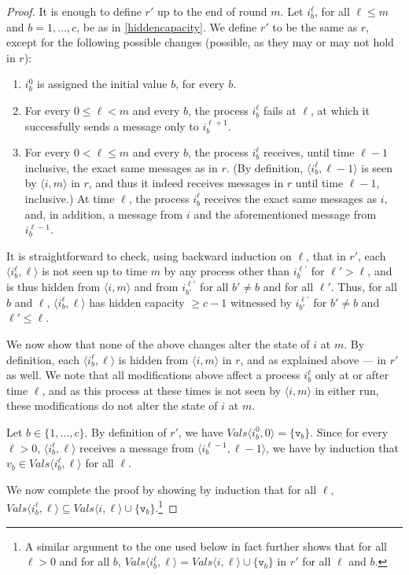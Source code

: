 \documentclass[11pt]{article}
\theoremstyle{definition}
\newcommand{\knownvals}[1]{\ensuremath{\mathit{Vals}\node{#1}}}
\newcommand{\set}[1]{\{#1\}}
\newcommand{\node}[1]{\langle#1\rangle}
\begin{document}
\begin{proof}
It is enough to define $r'$ up to the end of round $m$.
Let $i_b^{\ell}$,
for all $\ell\le m$ and $b=1,\ldots,c$,
be as in \cref{hiddencapacity}.
We define $r'$ to be the same as $r$, except for the following possible changes
(possible, as they may or may not hold in $r$):
\begin{enumerate}
\item
$i_b^0$ is assigned the initial value $b$, for every $b$.
\item
For every $0\le \ell < m$ and every $b$, the process
$i_b^{\ell}$ fails at $\ell$, at which
it successfully sends a message only to $i_b^{\ell+1}$.
\item
For every $0 < \ell \le m$ and every $b$, the process
$i_b^{\ell}$
receives, until time $\ell-1$ inclusive, the
exact same messages as in $r$. (By definition, $\node{i_b^\ell,\ell-1}$ is seen
by $\node{i,m}$ in $r$, and thus it indeed receives messages in $r$ until time
$\ell-1$, inclusive.) At time $\ell$, the process
$i_b^{\ell}$ receives the exact same messages as $i$, and, in addition,
a message from $i$ and the aforementioned message from~$i_b^{\ell-1}$.
\end{enumerate}

It is straightforward to check, using backward induction on $\ell$, that in $r'$,
each $\node{i_b^{\ell},\ell}$ is not seen up to time $m$ by any process
other than
$i_b^{\ell'}$ for $\ell'>\ell$,
and is thus hidden from $\node{i,m}$ and from $i_{b'}^{\ell'}$ for all
$b' \ne b$ and for all $\ell'$.
Thus, for all $b$ and $\ell$, $\node{i_b^{\ell},\ell}$
has hidden capacity $\ge c-1$ witnessed by
$i_{b'}^{\ell'}$ for $b'\ne b$ and $\ell'\le \ell$.

We now show that none of the above changes alter the state of $i$ at $m$.
By definition, each $\node{i_b^{\ell},\ell}$ is hidden from $\node{i,m}$
in $r$, and as explained above --- in $r'$ as well.
We note that all modifications above affect a process $i_b^{\ell}$ only at
or after time $\ell$, and as this process at these times is not seen by
$\node{i,m}$
in either run, these modifications do not alter the state of $i$
at $m$.

Let $b \in \set{1,\ldots,c}$.
By definition of $r'$, we have $\knownvals{i_b^0,0} = \set{\mathtt{v}_b}$.
Since for every $\ell>0$, $\node{i_b^{\ell},\ell}$ receives a message from
$\node{i_b^{\ell-1},\ell-1}$, we have by induction that
$v_b \in \knownvals{i_b^{\ell},\ell}$ for all $\ell$.

We now complete the proof by showing by induction that for all $\ell$,
$\knownvals{i_b^{\ell},\ell} \subseteq \knownvals{i,\ell} \cup \set{\mathtt{v}_b}$.\footnote{A similar argument to the one used below in fact further shows that
for all $\ell>0$ and for all $b$,
$\knownvals{i_b^{\ell},\ell} =
\knownvals{i,\ell} \cup \set{\mathtt{v}_b}$ in $r'$ for all $\ell$ and $b$.}


\end{proof}
\end{document}
